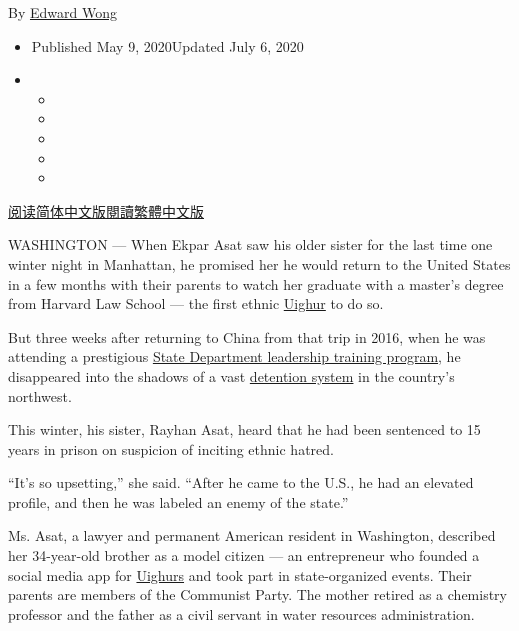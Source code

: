 By \href{https://www.nytimes.com/by/edward-wong}{Edward Wong}

\begin{itemize}
\item
  Published May 9, 2020Updated July 6, 2020
\item
  \begin{itemize}
  \item
  \item
  \item
  \item
  \item
  \end{itemize}
\end{itemize}

\href{https://cn.nytimes.com/china/20200511/china-uighurs-arrest/}{阅读简体中文版}\href{https://cn.nytimes.com/china/20200511/china-uighurs-arrest/zh-hant/}{閱讀繁體中文版}

WASHINGTON --- When Ekpar Asat saw his older sister for the last time
one winter night in Manhattan, he promised her he would return to the
United States in a few months with their parents to watch her graduate
with a master's degree from Harvard Law School --- the first ethnic
\href{https://www.nytimes.com/2020/07/06/world/asia/china-xinjiang-uighur-court.html}{Uighur}
to do so.

But three weeks after returning to China from that trip in 2016, when he
was attending a prestigious \href{https://eca.state.gov/ivlp}{State
Department leadership training program}, he disappeared into the shadows
of a vast
\href{https://www.nytimes.com/2018/09/08/world/asia/china-uighur-muslim-detention-camp.html}{detention
system} in the country's northwest.

This winter, his sister, Rayhan Asat, heard that he had been sentenced
to 15 years in prison on suspicion of inciting ethnic hatred.

``It's so upsetting,'' she said. ``After he came to the U.S., he had an
elevated profile, and then he was labeled an enemy of the state.''

Ms. Asat, a lawyer and permanent American resident in Washington,
described her 34-year-old brother as a model citizen --- an entrepreneur
who founded a social media app for
\href{https://www.nytimes.com/2020/07/01/technology/china-uighurs-hackers-malware-hackers-smartphones.html}{Uighurs}
and took part in state-organized events. Their parents are members of
the Communist Party. The mother retired as a chemistry professor and the
father as a civil servant in water resources administration.

